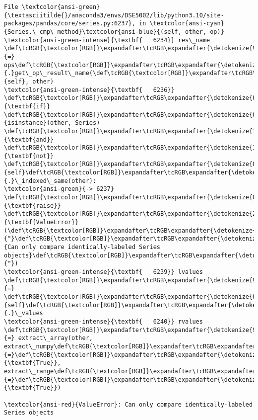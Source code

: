 \documentclass[11pt]{article}
\begin{document}
\begin{Verbatim}[commandchars=\\\{\}, frame=single, framerule=2mm, rulecolor=\color{outerrorbackground}]
File \textcolor{ansi-green}{\textasciitilde{}/anaconda3/envs/DSE5002/lib/python3.10/site-packages/pandas/core/series.py:6237}, in \textcolor{ansi-cyan}{Series.\_cmp\_method}\textcolor{ansi-blue}{(self, other, op)}
\textcolor{ansi-green-intense}{\textbf{   6234}} res\_name \def\tcRGB{\textcolor[RGB]}\expandafter\tcRGB\expandafter{\detokenize{98,98,98}}{=} ops\def\tcRGB{\textcolor[RGB]}\expandafter\tcRGB\expandafter{\detokenize{98,98,98}}{.}get\_op\_result\_name(\def\tcRGB{\textcolor[RGB]}\expandafter\tcRGB\expandafter{\detokenize{0,135,0}}{self}, other)
\textcolor{ansi-green-intense}{\textbf{   6236}} \def\tcRGB{\textcolor[RGB]}\expandafter\tcRGB\expandafter{\detokenize{0,135,0}}{\textbf{if}} \def\tcRGB{\textcolor[RGB]}\expandafter\tcRGB\expandafter{\detokenize{0,135,0}}{isinstance}(other, Series) \def\tcRGB{\textcolor[RGB]}\expandafter\tcRGB\expandafter{\detokenize{175,0,255}}{\textbf{and}} \def\tcRGB{\textcolor[RGB]}\expandafter\tcRGB\expandafter{\detokenize{175,0,255}}{\textbf{not}} \def\tcRGB{\textcolor[RGB]}\expandafter\tcRGB\expandafter{\detokenize{0,135,0}}{self}\def\tcRGB{\textcolor[RGB]}\expandafter\tcRGB\expandafter{\detokenize{98,98,98}}{.}\_indexed\_same(other):
\textcolor{ansi-green}{-> 6237}     \def\tcRGB{\textcolor[RGB]}\expandafter\tcRGB\expandafter{\detokenize{0,135,0}}{\textbf{raise}} \def\tcRGB{\textcolor[RGB]}\expandafter\tcRGB\expandafter{\detokenize{215,95,95}}{\textbf{ValueError}}(\def\tcRGB{\textcolor[RGB]}\expandafter\tcRGB\expandafter{\detokenize{175,0,0}}{"}\def\tcRGB{\textcolor[RGB]}\expandafter\tcRGB\expandafter{\detokenize{175,0,0}}{Can only compare identically-labeled Series objects}\def\tcRGB{\textcolor[RGB]}\expandafter\tcRGB\expandafter{\detokenize{175,0,0}}{"})
\textcolor{ansi-green-intense}{\textbf{   6239}} lvalues \def\tcRGB{\textcolor[RGB]}\expandafter\tcRGB\expandafter{\detokenize{98,98,98}}{=} \def\tcRGB{\textcolor[RGB]}\expandafter\tcRGB\expandafter{\detokenize{0,135,0}}{self}\def\tcRGB{\textcolor[RGB]}\expandafter\tcRGB\expandafter{\detokenize{98,98,98}}{.}\_values
\textcolor{ansi-green-intense}{\textbf{   6240}} rvalues \def\tcRGB{\textcolor[RGB]}\expandafter\tcRGB\expandafter{\detokenize{98,98,98}}{=} extract\_array(other, extract\_numpy\def\tcRGB{\textcolor[RGB]}\expandafter\tcRGB\expandafter{\detokenize{98,98,98}}{=}\def\tcRGB{\textcolor[RGB]}\expandafter\tcRGB\expandafter{\detokenize{0,135,0}}{\textbf{True}}, extract\_range\def\tcRGB{\textcolor[RGB]}\expandafter\tcRGB\expandafter{\detokenize{98,98,98}}{=}\def\tcRGB{\textcolor[RGB]}\expandafter\tcRGB\expandafter{\detokenize{0,135,0}}{\textbf{True}})

\textcolor{ansi-red}{ValueError}: Can only compare identically-labeled Series objects
    \end{Verbatim}
\end{document}
